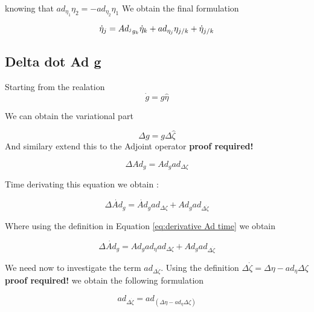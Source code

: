 \documentclass[12pt,a4paper]{book}
\begin{document}
knowing that $ad_{\eta_1} \eta_2 = - ad_{\eta_2} \eta_1$ We obtain the final formulation

\begin{equation}\label{eq:twist derivative final}
	\dot{\eta}_j 	= Ad_{^jg_k} \dot{\eta}_k + ad_{{\eta}_j}  \eta_{j/k} + \dot{\eta}_{j/k} \\
\end{equation}





\subsection{Delta dot Ad g}

Starting from the realation 
\begin{equation}
	\dot{g} = g \hat{\eta}
\end{equation}

We can obtain the variational part 

\begin{equation}
	\Delta g = g \Delta \hat{\zeta}
\end{equation}
 And similary extend this to the Adjoint operator \color{red}\textbf{proof required!}\color{black}

\begin{equation}\label{eq: Delta Ad g}
	\Delta Ad_g = Ad_g ad_{\Delta \zeta}
\end{equation}


Time derivating this equation we obtain :

\begin{equation}
	\Delta \dot{Ad}_g = \dot{Ad}_g ad_{\Delta \zeta} + Ad_g  ad_{\Delta \dot{\zeta} }
\end{equation}

Where using the definition in Equation \eqref{eq:derivative Ad time} we obtain 

\begin{equation}\label{eq: Delta dot Ad g}
	\Delta \dot{Ad}_g = Ad_g ad_\eta ad_{\Delta \zeta} + Ad_g  ad_{\Delta \dot{\zeta} }
\end{equation}

We need now to investigate the term $ad_{\Delta \dot{\zeta} }$. Using the definition $\Delta \dot{\zeta} = \Delta \eta - ad_\eta \Delta \zeta$ \color{red}\textbf{proof required!}\color{black} we obtain the following formulation 

\begin{equation}\label{eq: definition ad Delta dot zeta}
	ad_{\Delta \dot{\zeta}} = ad_{(\Delta \eta - ad_\eta \Delta \zeta)}
\end{equation}
\end{document}
